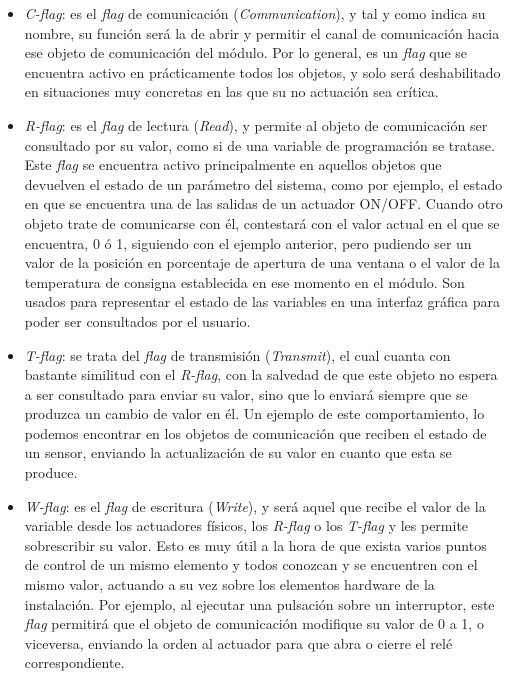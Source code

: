 \begin{itemize}
\item \textit {C-flag}: es el \textit{flag} de comunicación (\textit {Communication}), y tal y como indica su nombre, su función será la de abrir y permitir el canal de comunicación hacia ese objeto de comunicación del módulo. Por lo general, es un \textit{flag} que se encuentra activo en prácticamente todos los objetos, y solo será deshabilitado en situaciones muy concretas en las que su no actuación sea crítica.
\item \textit {R-flag}: es el \textit{flag} de lectura (\textit {Read}), y permite al objeto de comunicación ser consultado por su valor, como si de una variable de programación se tratase. Este \textit{flag} se encuentra activo principalmente en aquellos objetos que devuelven el estado de un parámetro del sistema, como por ejemplo, el estado en que se encuentra una de las salidas de un actuador ON/OFF. Cuando otro objeto trate de comunicarse con él, contestará con el valor actual en el que se encuentra, 0 ó 1, siguiendo con el ejemplo anterior, pero pudiendo ser un valor de la posición en porcentaje de apertura de una ventana o el valor de la temperatura de consigna establecida en ese momento en el módulo. Son usados para representar el estado de las variables en una interfaz gráfica para poder ser consultados por el usuario.
\item \textit {T-flag}: se trata del \textit{flag} de transmisión (\textit {Transmit}), el cual cuanta con bastante similitud con el \textit {R-flag}, con la salvedad de que este objeto no espera a ser consultado para enviar su valor, sino que lo enviará siempre que se produzca un cambio de valor en él. Un ejemplo de este comportamiento, lo podemos encontrar en los objetos de comunicación que reciben el estado de un sensor, enviando la actualización de su valor en cuanto que esta se produce.
\item \textit {W-flag}: es el \textit{flag} de escritura (\textit {Write}), y será aquel que recibe el valor de la variable desde los actuadores físicos, los \textit{R-flag} o los \textit{T-flag} y les permite sobrescribir su valor. Esto es muy útil a la hora de que exista varios puntos de control de un mismo elemento y todos conozcan y se encuentren con el mismo valor, actuando a su vez sobre los elementos hardware de la instalación. Por ejemplo, al ejecutar una pulsación sobre un interruptor, este \textit{flag} permitirá que el objeto de comunicación modifique su valor de 0 a 1, o viceversa, enviando la orden al actuador para que abra o cierre el relé correspondiente.

\end{itemize}
